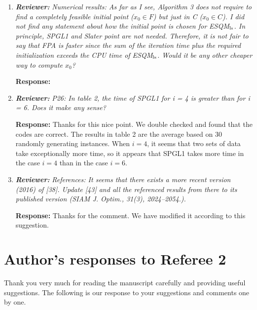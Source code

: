 \documentclass{article}
\begin{document}
\begin{enumerate}
	\item  \textit{\textbf{Reviewer:}} \textit{Numerical results: As far as I see, Algorithm 3 does not require to find a completely feasible initial point ($x_0\in F$) but just in C ($x_0\in C$). I did not find any statement about how the initial point is chosen for ESQM$_{\rm ls}$. In principle, SPGL1 and Slater point are not needed. Therefore, it is not fair to say that FPA is faster since the sum of the iteration time plus the required initialization exceeds the CPU time of ESQM$_{\rm ls}$. Would it be any other cheaper way to compute $x_0$?}
	
	\textbf{Response:} {\color{red}{Unanswered.}}

    \item  \textit{\textbf{Reviewer:}} \textit{P26: In table 2, the time of SPGL1 for i = 4 is greater than for i = 6. Does it make any sense?}
	
	\textbf{Response:} Thanks for this nice point. We double checked and found that the codes are correct. The results in table 2 are the average based on 30 randomly generating instances. When $i = 4$, it seems that two sets of data take exceptionally more time, so it appears that SPGL1 takes more time in the case $i = 4$ than in the case $i = 6$.

    \item  \textit{\textbf{Reviewer:}} \textit{References: It seems that there exists a more recent version (2016) of [38]. Update [43] and all the referenced results from there to its published version (SIAM J. Optim., 31(3), 2024--2054.).}
	
	\textbf{Response:} Thanks for the comment. We have modified it according to this suggestion.






\end{enumerate}


\section*{Author's responses to Referee 2}
Thank you very much for reading the manuscript carefully and providing useful suggestions. The following is our response to your suggestions and comments one by one.
\end{document}
